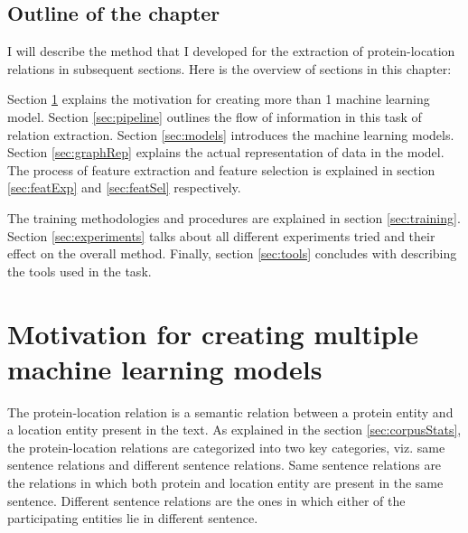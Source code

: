 \subsection*{Outline of the chapter}

I will describe the method that I developed for the extraction of protein-location relations in subsequent sections. Here is the overview of sections in this chapter: 

Section \ref{sec:ssModeldsModel} explains the motivation for creating more than 1 machine learning model. Section \ref{sec:pipeline} outlines the flow of information in this task of relation extraction. Section \ref{sec:models} introduces the machine learning models. Section \ref{sec:graphRep} explains the actual representation of data in the model. The process of feature extraction and feature selection is explained in section \ref{sec:featExp} and \ref{sec:featSel} respectively.

The training methodologies and procedures are explained in section \ref{sec:training}. Section \ref{sec:experiments} talks about all different experiments tried and their effect on the overall method. Finally, section \ref{sec:tools} concludes with describing the tools used in the task.

\section{Motivation for creating multiple machine learning models}\label{sec:ssModeldsModel}

The protein-location relation is a semantic relation between a protein entity and a location entity present in the text. As explained in the section \ref{sec:corpusStats}, the protein-location relations are categorized into two key categories, viz. same sentence relations and different sentence relations. Same sentence relations are the relations in which both protein and location entity are present in the same sentence. Different sentence relations are the ones in which either of the participating entities lie in different sentence.

